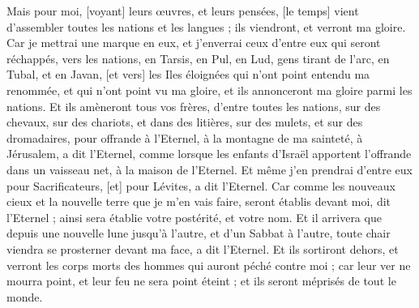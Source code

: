 \begin{multicols}{2}
Mais pour moi, [voyant] leurs œuvres, et leurs pensées, [le temps] vient d'assembler toutes les nations et les langues ; ils viendront, et verront ma gloire.
Car je mettrai une marque en eux, et j'enverrai ceux d'entre eux qui seront réchappés, vers les nations, en Tarsis, en Pul, en Lud, gens tirant de l'arc, en Tubal, et en Javan, [et vers] les Iles éloignées qui n'ont point entendu ma renommée, et qui n'ont point vu ma gloire, et ils annonceront ma gloire parmi les nations.
Et ils amèneront tous vos frères, d'entre toutes les nations, sur des chevaux, sur des chariots, et dans des litières, sur des mulets, et sur des dromadaires, pour offrande à l'Eternel, à la montagne de ma sainteté, à Jérusalem, a dit l'Eternel, comme lorsque les enfants d'Israël apportent l'offrande dans un vaisseau net, à la maison de l'Eternel.
Et même j'en prendrai d'entre eux pour Sacrificateurs, [et] pour Lévites, a dit l'Eternel.
Car comme les nouveaux cieux et la nouvelle terre que je m'en vais faire, seront établis devant moi, dit l'Eternel ; ainsi sera établie votre postérité, et votre nom.
Et il arrivera que depuis une nouvelle lune jusqu'à l'autre, et d'un Sabbat à l'autre, toute chair viendra se prosterner devant ma face, a dit l'Eternel.
Et ils sortiront dehors, et verront les corps morts des hommes qui auront péché contre moi ; car leur ver ne mourra point, et leur feu ne sera point éteint ; et ils seront méprisés de tout le monde.
\PPE{}
\end{multicols}
